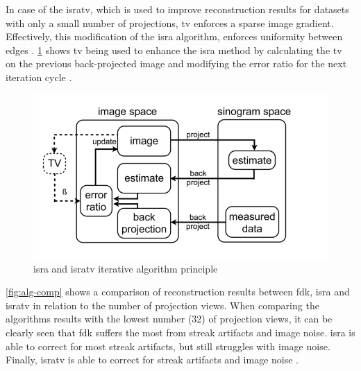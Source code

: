 In case of the \gls{isratv}, which is used to improve reconstruction results for datasets with only a small number of projections,
\acrfull{tv} enforces a sparse image gradient.
Effectively, this modification of the \gls{isra} algorithm, enforces uniformity between edges \cite{vandeghinsteLowDoseMicroCTImaging2013}.
\cref{fig:isra} shows \acrshort{tv} being used to enhance the \gls{isra} method by
calculating the \acrshort{tv} on the previous back-projected image and modifying the error ratio for the next iteration cycle \cite{vandeghinsteLowDoseMicroCTImaging2013}.
\begin{figure}[h]
	\centerline{
		\includegraphics[scale=0.5]{images/isra.png}}
	\caption{\gls{isra} and \gls{isratv} iterative algorithm principle \cite{vandeghinsteLowDoseMicroCTImaging2013}}
	\label{fig:isra}
\end{figure}
\noindent
\cref{fig:alg-comp} shows a comparison of reconstruction results between \gls{fdk}, \gls{isra} and \gls{isratv}
in relation to the number of projection views.
When comparing the algorithms results with the lowest number (32) of projection views,
it can be clearly seen that \gls{fdk} suffers the most from streak artifacts and image noise.
\gls{isra} is able to correct for most streak artifacts, but still struggles with image noise.
Finally, \gls{isratv} is able to correct for streak artifacts and image noise \cite{vandeghinsteLowDoseMicroCTImaging2013}.
